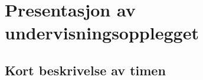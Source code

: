 \documentclass[12pt,a4paper]{article}
\begin{document}
\section{Presentasjon av undervisningsopplegget}
\label{sec:undervisningsopplegget}


\subsection*{Kort beskrivelse av timen}%
\label{sub:kort_beskrivelse}





\end{document}
